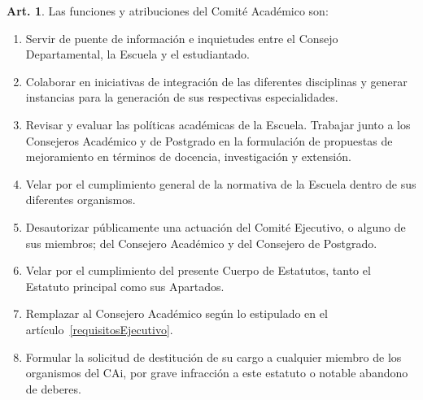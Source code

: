 \documentclass[letterpaper,11pt]{article}
\theoremstyle{definition}%
\newtheorem{art}{Art.} %
\begin{document}
\begin{art}\label{funcionesComiteAcademico}
	Las funciones y atribuciones del Comité Académico son:
	\begin{enumerate}
		\item Servir de puente de información e inquietudes entre el Consejo Departamental, la Escuela y el estudiantado.
		\item Colaborar en iniciativas de integración de las diferentes disciplinas y generar instancias para la generación de sus respectivas especialidades.
		\item Revisar y evaluar las políticas académicas de la Escuela. Trabajar junto a los Consejeros Académico y de Postgrado en la formulación de propuestas de mejoramiento en términos de docencia, investigación y extensión.
		\item Velar por el cumplimiento general de la normativa de la Escuela dentro de sus diferentes organismos.
		\item Desautorizar públicamente una actuación del Comité Ejecutivo, o alguno de sus miembros; del Consejero Académico y del Consejero de Postgrado.
		\item Velar por el cumplimiento del presente Cuerpo de Estatutos, tanto el Estatuto principal como sus Apartados.
		\item Remplazar al Consejero Académico según lo estipulado en el artículo~\ref{requisitosEjecutivo}.
		\item Formular la solicitud de destitución de su cargo a cualquier miembro de los organismos del CAi, por grave infracción a este estatuto o notable abandono de deberes.
	\end{enumerate}
\end{art}
\end{document}
